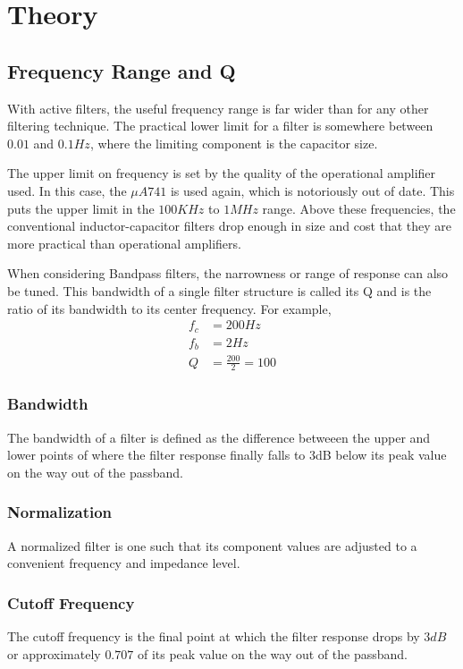 \documentclass[12pt]{article}
\begin{document}
\section{Theory}
\subsection{Frequency Range and Q}
With active filters, the useful frequency range is far wider than for any other
filtering technique. The practical lower limit for a filter is somewhere between $0.01$ and $0.1Hz$, where the limiting component is the capacitor size.

The upper limit on frequency is set by the quality of the operational amplifier used. In this case, the $\mu A741$ is used again, which is notoriously out of date. This puts the upper limit in the $100KHz$ to $1MHz$ range. Above these frequencies, the conventional inductor-capacitor filters drop enough in size and cost that they are more practical than operational amplifiers.

When considering Bandpass filters, the narrowness or range of response can also be tuned. This bandwidth of a single filter structure is called its Q and is the ratio of its bandwidth to its center frequency. For example,
\begin{align*}
	f_c &= 200Hz \\
	f_b &= 2Hz \\
	Q &= \frac{200}{2} = 100
\end{align*}
\subsubsection{Bandwidth}
The bandwidth of a filter is defined as the difference betweeen the upper and lower points of where the filter response finally falls to 3dB below its peak value on the way out of the passband.

\subsubsection{Normalization}
A normalized filter is one such that its component values are adjusted to a convenient frequency and impedance level.

\subsubsection{Cutoff Frequency}
The cutoff frequency is the final point at which the filter response drops by $3 dB$ or approximately $0.707$ of its peak value on the way out of the passband.
\end{document}

